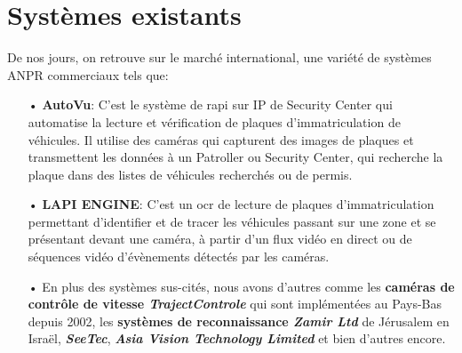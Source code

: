 \section{Systèmes existants}
De nos jours, on retrouve sur le marché international, une variété de systèmes ANPR commerciaux tels que:
    \begin{itemize}
        \item[•]\textbf{AutoVu}: C’est le système de \acrfull{rapi} sur IP de Security Center qui automatise la lecture et vérification de plaques d'immatriculation de véhicules. Il utilise des caméras qui capturent des images de plaques et transmettent les données à un Patroller ou Security Center, qui recherche la plaque dans des listes de véhicules recherchés ou de permis. \cite{autoVu}
        \item[•]\textbf{LAPI ENGINE}: C’est un \acrshort{ocr} de lecture de plaques d'immatriculation permettant d'identifier et de tracer les véhicules passant sur une zone et se présentant devant une caméra, à partir d'un flux vidéo en direct ou de séquences vidéo d'évènements détectés par les caméras. \cite{lapiWeb}
        \item[•] En plus des systèmes sus-cités, nous avons d'autres comme les \textbf{caméras de contrôle de vitesse \textit{TrajectControle}} qui sont implémentées au Pays-Bas depuis 2002, les \textbf{systèmes de reconnaissance \textit{Zamir Ltd}} de Jérusalem en Israël, \textbf{\textit{SeeTec}}, \textbf{\textit{Asia Vision Technology Limited}} et bien d'autres encore. \cite{HindeThesis, NorMaster}
    \end{itemize} 
    